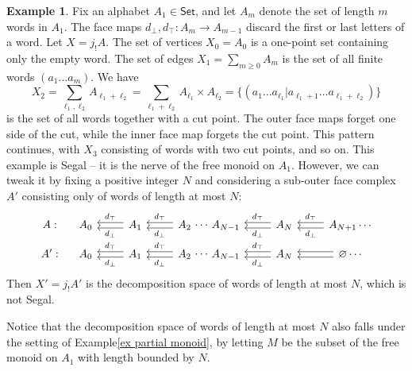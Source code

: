 \documentclass{conm-p-l}
\theoremstyle{definition}
\newtheorem{example}[theorem]{Example}
\theoremstyle{remark}
\newcommand{\set}{\mathsf{Set}}
\begin{document}
\begin{example}\label{example words}
Fix an alphabet $A_1 \in \set$, and let $A_m$ denote the set of length $m$ words in $A_1$.
The face maps $d_\bot, d_\top \colon A_m \to A_{m-1}$ discard the first or last letters of a word.
Let $X = j_!A$.
The set of vertices $X_0 = A_0$ is a one-point set containing only the empty word.
The set of edges $X_1 = \sum_{m\geq 0} A_m$ is the set of all finite words $(a_1 \dots a_m)$.
We have
\[
  X_2 = \sum_{\ell_1, \ell_2} A_{\ell_1 + \ell_2} = \sum_{\ell_1+\ell_2} A_{\ell_1} \times A_{\ell_2} = \{ (a_1 \dots a_{\ell_1} | a_{\ell_1+1} \dots a_{\ell_1+\ell_2} ) \}
\]
is the set of all words together with a cut point.
The outer face maps forget one side of the cut, while the inner face map forgets the cut point.
This pattern continues, with $X_3$ consisting of words with two cut points, and so on.
This example is Segal -- it is the nerve of the free monoid on $A_1$.
However, we can tweak it by fixing a positive integer $N$ and considering a sub-outer face complex $A'$ consisting only of words of length at most $N$:
\begin{equation*}\label{eq truncation} 
\begin{tikzcd}[row sep=small]
A: &[-0.5cm] A_0 & 
A_1 \lar[shift left, "d_\bot"] \lar[shift right, "d_\top"'] & 
A_2 \lar[shift left, "d_\bot"] \lar[shift right, "d_\top"'] %
\rar[phantom, "\cdots"]  &[-0.5cm] 
A_{N-1} &
A_{N} \lar[shift left, "d_\bot"] \lar[shift right, "d_\top"'] &
A_{N+1} \lar[shift left, "d_\bot"] \lar[shift right, "d_\top"'] \cdots
\\
A': &[-0.5cm] A_0 & 
A_1 \lar[shift left, "d_\bot"] \lar[shift right, "d_\top"'] & 
A_2 \lar[shift left, "d_\bot"] \lar[shift right, "d_\top"'] %
\rar[phantom, "\cdots"]  &[-0.5cm] 
A_{N-1} &
A_{N} \lar[shift left, "d_\bot"] \lar[shift right, "d_\top"'] &
\varnothing \lar[shift left] \lar[shift right] \cdots
\end{tikzcd} \end{equation*}
Then $X' = j_!A'$ is the decomposition space of words of length at most $N$, which is not Segal.
\end{example}

Notice that the decomposition space of words of length at most $N$ also falls under the setting of Example\nobreakspace \ref {ex partial monoid}, by letting $M$ be the subset of the free monoid on $A_1$ with length bounded by $N$.
\end{document}
